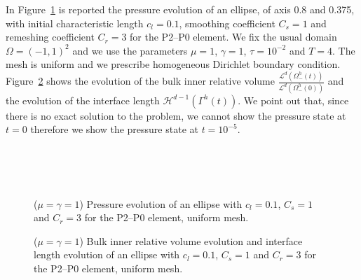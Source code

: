 \documentclass[a4paper,12pt,onecolumn]{article}
\begin{document}
In Figure~\ref{fig:ellipse_both} is reported the pressure evolution of an ellipse, of axis 0.8 and 0.375, with initial characteristic length $c_l=0.1$, smoothing coefficient $C_s=1$ and remeshing coefficient $C_r=3$ for the P2--P0 element. We fix the usual domain $\Omega = (-1,1)^2$ and we use the parameters $\mu=1$, $\gamma=1$, $\tau=10^{-2}$ and $T=4$. The mesh is uniform and we prescribe homogeneous Dirichlet
boundary condition. Figure~\ref{fig:ellipse_both_volumes} shows the evolution of the bulk inner relative volume $\frac{\mathcal{L}^d(\Omega^h_-(t))}{\mathcal{L}^d(\Omega^h_-(0))}$ and the evolution of the interface length $\mathcal{H}^{d-1}(\Gamma^h(t))$. We point out that, since there is no exact solution to the problem, we cannot show the pressure state at $t=0$ therefore we show the pressure state at $t=10^{-5}$.
\begin{figure}[htbp]
  \centering
  \\
  \quad
  \\
  \quad
  \\
  \caption{($\mu=\gamma=1$) Pressure evolution of an ellipse with $c_l=0.1$, $C_s=1$ and $C_r=3$ for the P2--P0 element, uniform mesh.}
  \label{fig:ellipse_both}
\end{figure}

\begin{figure}[htbp]
  \centering
  \caption{($\mu=\gamma=1$) Bulk inner relative volume evolution and interface length evolution of an ellipse with $c_l=0.1$, $C_s=1$ and $C_r=3$ for the P2--P0 element, uniform mesh.}
  \label{fig:ellipse_both_volumes}
\end{figure}
\end{document}
